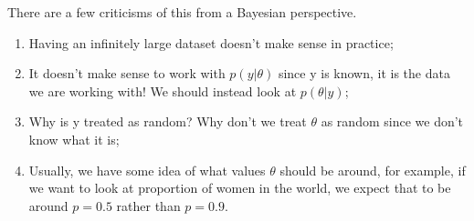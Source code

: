 \documentclass[twoside]{article}
\begin{document}
There are a few criticisms of this from a Bayesian perspective.
\begin{enumerate}
    \item Having an infinitely large dataset doesn't make sense in practice;
    \item It doesn't make sense to work with $p(y|\theta)$ since y is known, it is the data we are working with! We should instead look at $p(\theta|y)$;
    \item Why is y treated as random? Why don't we treat $\theta$ as random since we don't know what it is;
    \item Usually, we have some idea of what values $\theta$ should be around, for example, if we want to look at proportion of women in the world, we expect that to be around $p = 0.5$ rather than $p = 0.9$.
\end{enumerate}
 
\end{document}
